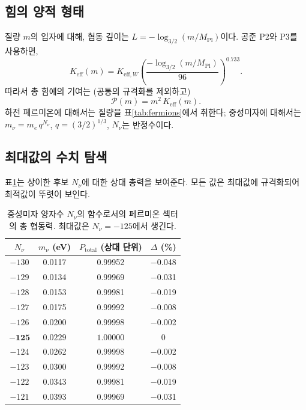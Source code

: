 \documentclass[12pt,a4paper]{article}
\begin{document}
	\subsection{힘의 양적 형태}
	
	질량 \(m\)의 입자에 대해, 협동 깊이는 \(L = -\log_{3/2}(m/M_{\mathrm{Pl}})\)이다. 공준 P2와 P3를 사용하면,
	\begin{equation}
		K_{\mathrm{eff}}(m) = K_{\mathrm{eff},W} \left( \frac{-\log_{3/2}(m/M_{\mathrm{Pl}})}{96} \right)^{0.733}.
	\end{equation}
	따라서 총 힘에의 기여는 (공통의 규격화를 제외하고)
	\begin{equation}
		\mathcal{P}(m) = m^2 \, K_{\mathrm{eff}}(m).
	\end{equation}
	하전 페르미온에 대해서는 질량을 표\ref{tab:fermions}에서 취한다; 중성미자에 대해서는 \(m_{\nu} = m_e \, q^{N_{\nu}}\), \(q=(3/2)^{1/3}\), \(N_{\nu}\)는 반정수이다.
	
	\subsection{최대값의 수치 탐색}
	
	표\ref{tab:power}는 상이한 후보 \(N_{\nu}\)에 대한 상대 총력을 보여준다. 모든 값은 최대값에 규격화되어 최적값이 뚜렷이 보인다.
	
	\begin{table}[H]
		\centering
		\caption{중성미자 양자수 \(N_{\nu}\)의 함수로서의 페르미온 섹터의 총 협동력. 최대값은 \(N_{\nu}=-125\)에서 생긴다.}
		\label{tab:power}
		\small
		\begin{tabular}{c c c c}
			\toprule
			\(N_{\nu}\) & \(m_{\nu}\) (eV) & \(P_{\mathrm{total}}\) (상대 단위) & \(\Delta\) (\%) \\
			\midrule
			\(-130\) & 0.0117 & 0.99952 & $-$0.048 \\
			\(-129\) & 0.0134 & 0.99969 & $-$0.031 \\
			\(-128\) & 0.0153 & 0.99981 & $-$0.019 \\
			\(-127\) & 0.0175 & 0.99992 & $-$0.008 \\
			\(-126\) & 0.0200 & 0.99998 & $-$0.002 \\
			$\mathbf{-125}$ & $\mathbf{0.0229}$ & $\mathbf{1.00000}$ & 0 \\
			\(-124\) & 0.0262 & 0.99998 & $-$0.002 \\
			\(-123\) & 0.0300 & 0.99992 & $-$0.008 \\
			\(-122\) & 0.0343 & 0.99981 & $-$0.019 \\
			\(-121\) & 0.0393 & 0.99969 & $-$0.031 \\
			\bottomrule
		\end{tabular}
	\end{table}
	
\end{document}
